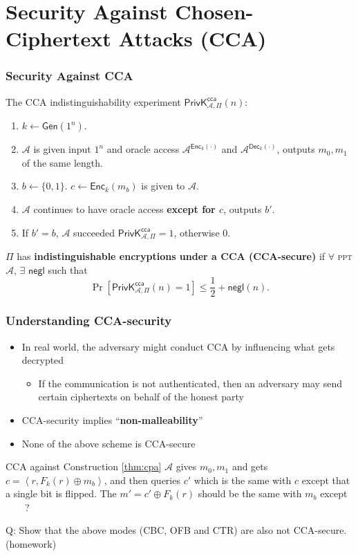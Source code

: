 \section{Security Against Chosen-Ciphertext Attacks (CCA)}
\begin{frame}\frametitle{Security Against CCA}
The CCA indistinguishability experiment $\mathsf{PrivK}^{\mathsf{cca}}_{\mathcal{A},\Pi}(n)$:
\begin{enumerate}
	\item $k \gets \mathsf{Gen}(1^n)$.
	\item $\mathcal{A}$ is given input $1^n$ and oracle access $\mathcal{A}^{\mathsf{Enc}_k(\cdot)}$ and $\mathcal{A}^{\mathsf{Dec}_k(\cdot)}$, outputs $m_0, m_1$ of the same length.
	\item $b \gets \{0,1\}$. $c \gets \mathsf{Enc}_k(m_b)$ is given to $\mathcal{A}$.
	\item $\mathcal{A}$ continues to have oracle access \alert{\textbf{except for $c$}}, outputs $b'$.
	\item If $b' = b$, $\mathcal{A}$ succeeded $\mathsf{PrivK}^{\mathsf{cca}}_{\mathcal{A},\Pi}=1$, otherwise 0.
\end{enumerate}
\begin{definition}
$\Pi$ has \textbf{indistinguishable encryptions under a CCA (CCA-secure)} if $\forall$ \textsc{ppt} $\mathcal{A}$, $\exists$ $\mathsf{negl}$ such that
\[ \Pr\left[\mathsf{PrivK}^{\mathsf{cca}}_{\mathcal{A},\Pi}(n)=1\right] \le \frac{1}{2} + \mathsf{negl}(n).
\]
\end{definition}
\end{frame}
\begin{frame}\frametitle{Understanding CCA-security}
\begin{itemize}
\item In real world, the adversary might conduct CCA by influencing what gets decrypted
\begin{itemize}
\item If the communication is not authenticated, then an adversary may send certain ciphertexts on behalf of the honest party
\end{itemize}
\item CCA-security implies ``\textbf{non-malleability}''
\item None of the above scheme is CCA-secure
\end{itemize}
\begin{exampleblock}{CCA against Construction \ref{thm:cpa}}
$\mathcal{A}$ gives $m_{0}, m_{1}$ and gets $c = \left<r, F_k(r)\oplus m_{b}\right>$, 
and then queries $c'$ which is the same with $c$ except that a single bit is flipped. 
The $m' = c' \oplus F_k(r)$ should be the same with $m_{b}$ \alert{except \underline{$\qquad$}?}
\end{exampleblock}
\alert{Q: Show that the above modes (CBC, OFB and CTR) are also not CCA-secure. (homework)}
\end{frame}
